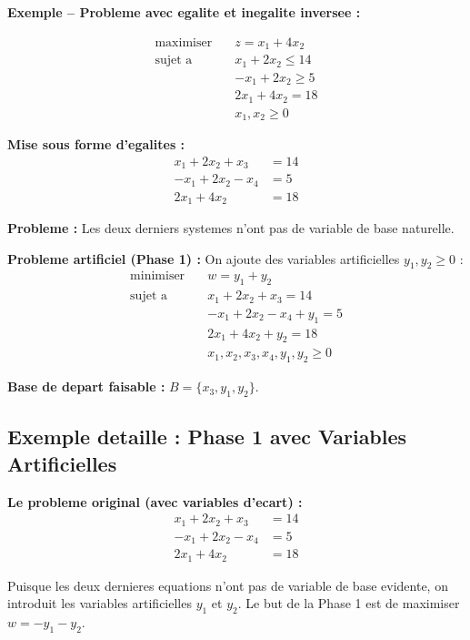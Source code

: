 \documentclass[12pt,a4paper]{article}
\begin{document}
\begin{exemple}
\textbf{Exemple -- Probleme avec egalite et inegalite inversee :}

\begin{align*}
\text{maximiser} \quad & z = x_1 + 4x_2\\
\text{sujet a} \quad & x_1 + 2x_2 \leq 14\\
& -x_1 + 2x_2 \geq 5\\
& 2x_1 + 4x_2 = 18\\
& x_1, x_2 \geq 0
\end{align*}

\textbf{Mise sous forme d'egalites :}
\begin{align*}
x_1 + 2x_2 + x_3 &= 14\\
-x_1 + 2x_2 - x_4 &= 5\\
2x_1 + 4x_2 &= 18
\end{align*}

\textbf{Probleme :} Les deux derniers systemes n'ont pas de variable de base naturelle.

\textbf{Probleme artificiel (Phase 1) :} On ajoute des variables artificielles $y_1, y_2 \geq 0$ :
\begin{align*}
\text{minimiser} \quad & w = y_1 + y_2\\
\text{sujet a} \quad & x_1 + 2x_2 + x_3 = 14\\
& -x_1 + 2x_2 - x_4 + y_1 = 5\\
& 2x_1 + 4x_2 + y_2 = 18\\
& x_1, x_2, x_3, x_4, y_1, y_2 \geq 0
\end{align*}

\textbf{Base de depart faisable :} $B = \{x_3, y_1, y_2\}$.
\end{exemple}
\newpage
\subsection{Exemple detaille : Phase 1 avec Variables Artificielles}

\textbf{Le probleme original (avec variables d'ecart) :}
\begin{align*}
x_1 + 2x_2 + x_3 &= 14 \\
-x_1 + 2x_2 - x_4 &= 5 \\
2x_1 + 4x_2 &= 18
\end{align*}

Puisque les deux dernieres equations n'ont pas de variable de base evidente, on introduit les variables artificielles $y_1$ et $y_2$. Le but de la Phase 1 est de maximiser $w = -y_1 - y_2$.
\end{document}
